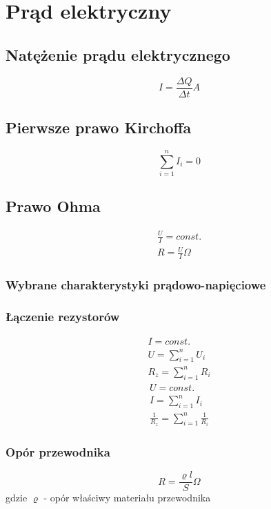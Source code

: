   \chapter{Prąd elektryczny}
    \section{Natężenie prądu elektrycznego}
      \begin{equation}
        I = \frac{\Delta Q}{\Delta t} \unit{A}
      \end{equation}
    \section{Pierwsze prawo Kirchoffa}
      \begin{equation}
        \sum_{i=1}^n I_i = 0
      \end{equation}
    \section{Prawo Ohma}
      \begin{gather}
        \frac{U}{I} = const.\\
        R = \frac{U}{I} \unit{\Omega}
      \end{gather}
      \subsection{Wybrane charakterystyki prądowo-napięciowe}
      \subsection{Łączenie rezystorów}
        \begin{gather}
          I = const.\\
          U = \sum_{i=1}^n U_i\\
          R_z = \sum_{i=1}^n R_i
        \end{gather}
        \begin{gather}
          U = const.\\
          I = \sum_{i=1}^n I_i\\
          \frac{1}{R_z} = \sum_{i=1}^n \frac{1}{R_i}
        \end{gather}
      \subsection{Opór przewodnika}
        \begin{equation}
          R = \frac{\varrho l}{S} \unit{\Omega}
        \end{equation}
      gdzie $\varrho$ - opór właściwy materiału przewodnika
